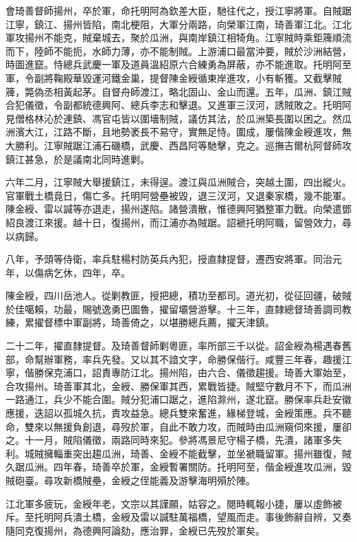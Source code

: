 \begin{pinyinscope}
會琦善督師揚州，卒於軍，命托明阿為欽差大臣，馳往代之，授江寧將軍。自賊踞江寧，鎮江、揚州皆陷，南北梗阻，大軍分兩路，向榮軍江南，琦善軍江北。江北軍攻揚州不能克，賊棄城去，聚於瓜洲，與南岸鎮江相犄角。江寧賊時乘鉅簰順流而下，陸師不能扼，水師力薄，亦不能制賊。上游浦口最當沖要，賊於沙洲結營，時圖進竄。恃總兵武慶一軍及道員溫紹原六合練勇為屏蔽，亦不能進取。托明阿至軍，令副將鞠殿華毀運河鐵金巢，提督陳金綬循東岸進攻，小有斬獲。又截擊賊簰，斃偽丞相黃起茅。自督舟師渡江，略北固山、金山而還。五年，瓜洲、鎮江賊合犯儀徵，令副都統德興阿、總兵李志和擊退。又進軍三汊河，誘賊敗之。托明阿見僧格林沁於連鎮、馮官屯皆以圍墻制賊，議仿其法，於瓜洲築長圍以困之。然瓜洲濱大江，江路不斷，且地勢袤長不易守，實無足恃。圍成，屢偕陳金綬進攻，無大勝利。江寧賊踞江浦石磯橋，武慶、西昌阿等馳擊，克之。巡撫吉爾杭阿督師攻鎮江甚急，於是議南北同時進剿。

六年二月，江寧賊大舉援鎮江，未得逞。渡江與瓜洲賊合，突越土圍，四出縱火。官軍戰土橋竟日，傷亡多。托明阿營壘被毀，退三汊河，又退秦家橋，幾不能軍。陳金綬、雷以諴等亦退走，揚州遂陷。諸營潰散，惟德興阿猶整軍力戰。向榮遣鄧紹良渡江來援。越十日，復揚州，而江浦亦為賊踞。詔褫托明阿職，留營效力，尋以病歸。

八年，予頭等侍衛，率兵駐楊村防英兵內犯，授直隸提督，遷西安將軍。同治元年，以傷病乞休，四年，卒。

陳金綬，四川岳池人。從剿教匪，授把總，積功至都司。道光初，從征回疆，破賊於佳噶賴，功最，賜號逸勇巴圖魯，擢留壩營游擊。十三年，直隸總督琦善調司教練，累擢督標中軍副將，琦善倚之，以堪勝總兵薦，擢天津鎮。

二十二年，擢直隸提督。及琦善督師剿粵匪，率所部三千以從。詔金綬為楊遇春舊部，命幫辦軍務，率兵先發。又以其不諳文字，命勝保偕行。咸豐三年春，趣援江寧，偕勝保克浦口，詔責專防江北。揚州陷，由六合、儀徵趨援。琦善大軍始至，合攻揚州。琦善軍其北，金綬、勝保軍其西，累戰皆捷。賊堅守數月不下，而瓜洲一路通江，兵少不能合圍。賊分犯浦口踞之，進陷滁州，遂北竄。勝保率兵赴安徽應援，迭詔以孤城久抗，責攻益急。總兵雙來奮進，緣梯登城，金綬策應。兵不聽命，雙來以無援負創退，尋歿於軍，自此不敢力攻，而賊時由瓜洲窺伺來援，屢卻之。十一月，賊陷儀徵，兩路同時來犯。參將馮景尼守楊子橋，先潰，諸軍多失利。城賊擁輜重突出趨瓜洲，琦善、金綬不能截擊，並坐褫職留軍。揚州雖復，賊久踞瓜洲。四年春，琦善卒於軍，金綬暫署關防。托明阿至，偕金綬進攻瓜洲，毀賊砲臺。尋攻新橋賊壘，金綬之侄能義及游擊海明殞於陣。

江北軍多疲玩，金綬年老，文宗以其謹願，姑容之。閱時輒報小捷，屢以虛飾被斥。至托明阿兵潰土橋，金綬及雷以諴駐萬福橋，望風而走。事後飾辭自辨，又奏隨同克復揚州，為德興阿論劾，應治罪，金綬已先歿於軍矣。


\end{pinyinscope}
